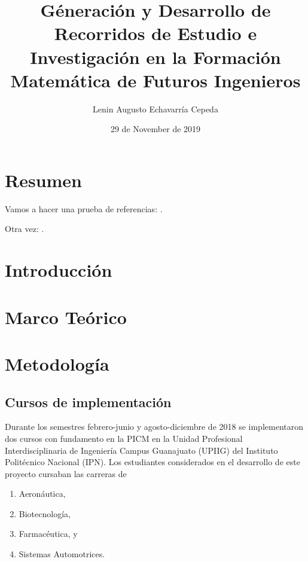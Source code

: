 \documentclass[spanish,]{book}
\title{Géneración y Desarrollo de Recorridos de Estudio e Investigación en la Formación Matemática de Futuros Ingenieros}
\author{Lenin Augusto Echavarría Cepeda}
\date{29 de November de 2019}
\providecommand{\tightlist}{%
  \setlength{\itemsep}{0pt}\setlength{\parskip}{0pt}}
\begin{document}
\maketitle

{
\setcounter{tocdepth}{1}
\tableofcontents
}
\hypertarget{resumen}{%
\chapter*{Resumen}\label{resumen}}

Vamos a hacer una prueba de referencias: \citep{Barquero2018, Bartolome2018}.

Otra vez: \citep{Barquero2018, Bartolome2018}.

\hypertarget{introducciuxf3n}{%
\chapter{Introducción}\label{introducciuxf3n}}

\hypertarget{marco-teuxf3rico}{%
\chapter{Marco Teórico}\label{marco-teuxf3rico}}

\hypertarget{metodologuxeda}{%
\chapter{Metodología}\label{metodologuxeda}}

\hypertarget{cursos-de-implementaciuxf3n}{%
\section{Cursos de implementación}\label{cursos-de-implementaciuxf3n}}

Durante los semestres febrero-junio y agosto-diciembre de 2018 se implementaron dos cursos con fundamento en la PICM en la Unidad Profesional Interdisciplinaria de Ingeniería Campus Guanajuato (UPIIG) del Instituto Politécnico Nacional (IPN). Los estudiantes considerados en el desarrollo de este proyecto cursaban las carreras de

\begin{enumerate}
\def\labelenumi{\arabic{enumi}.}
\tightlist
\item
  Aeronáutica,
\item
  Biotecnología,
\item
  Farmacéutica, y
\item
  Sistemas Automotrices.
\end{enumerate}
\end{document}
